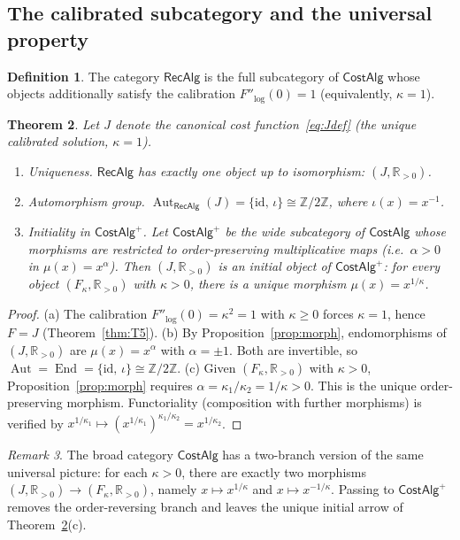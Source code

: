 \documentclass[11pt,reqno]{amsart}
\theoremstyle{plain}
\newtheorem{theorem}{Theorem}[section]
\theoremstyle{definition}
\newtheorem{definition}[theorem]{Definition}
\theoremstyle{remark}
\newtheorem{remark}[theorem]{Remark} %
\newcommand{\Jcost}{J}
\newcommand{\RR}{\mathbb{R}}
\newcommand{\ZZ}{\mathbb{Z}}
\newcommand{\1}{\mathbf{1}}
\newcommand{\paperadd}[1]{{\color{paperblue}#1}}
\begin{document}
\subsection{The calibrated subcategory and the universal property}
\begin{definition}\label{def:cat}
The category $\mathsf{RecAlg}$ is the full subcategory of
$\mathsf{CostAlg}$ whose objects additionally satisfy the
calibration $F''_{\!\log}(0)=1$ (equivalently, $\kappa=1$).
\end{definition} 

\begin{theorem}\label{thm:initial}
Let $\Jcost$ denote the canonical cost function~\eqref{eq:Jdef}
(the unique calibrated solution, $\kappa=1$).
\begin{enumerate}[nosep,label=\textup{(\alph*)}]
\item Uniqueness. $\mathsf{RecAlg}$ has exactly one object up to isomorphism: $(\Jcost,\RR_{>0})$.
\item Automorphism group. $\operatorname{Aut}_{\mathsf{RecAlg}}(\Jcost) =\{\mathrm{id},\,\iota\}\cong\ZZ/2\ZZ$, where $\iota(x)=x^{-1}$.
\item Initiality in $\mathsf{CostAlg}^{+}$. Let $\mathsf{CostAlg}^{+}$ be the wide subcategory of $\mathsf{CostAlg}$ whose morphisms are restricted to \emph{order-preserving} multiplicative maps (i.e.\ $\alpha>0$ in $\mu(x)=x^\alpha$). Then $(\Jcost,\RR_{>0})$ is an \emph{initial object} of $\mathsf{CostAlg}^{+}$: for every object $(F_\kappa,\RR_{>0})$ with $\kappa>0$, there is a unique morphism $\mu(x)=x^{1/\kappa}$.
\end{enumerate}
\end{theorem}

\begin{proof}
(a) The calibration $F''_{\!\log}(0)=\kappa^2=1$ with $\kappa\ge0$
forces $\kappa=1$, hence $F=\Jcost$ (Theorem~\ref{thm:T5}). (b) By Proposition~\ref{prop:morph}, endomorphisms of
$(\Jcost,\RR_{>0})$ are $\mu(x)=x^\alpha$ with
$\alpha=\pm1$. Both are invertible, so
$\operatorname{Aut}=\operatorname{End}
=\{\mathrm{id},\,\iota\}\cong\ZZ/2\ZZ$. (c) Given $(F_\kappa,\RR_{>0})$ with $\kappa>0$,
Proposition~\ref{prop:morph} requires $\alpha=\kappa_1/\kappa_2
=1/\kappa>0$. This is the unique order-preserving morphism.
Functoriality (composition with further morphisms) is verified by
$x^{1/\kappa_1}\mapsto (x^{1/\kappa_1})^{\kappa_1/\kappa_2}
=x^{1/\kappa_2}$.
\end{proof} 

\begin{remark}\label{rem:signed-cost-morphisms}
\paperadd{The broad category $\mathsf{CostAlg}$ has a two-branch version of the same universal picture: for each \(\kappa>0\), there are exactly two morphisms \((\Jcost,\RR_{>0})\to(F_\kappa,\RR_{>0})\), namely \(x\mapsto x^{1/\kappa}\) and \(x\mapsto x^{-1/\kappa}\). Passing to \(\mathsf{CostAlg}^{+}\) removes the order-reversing branch and leaves the unique initial arrow of Theorem~\ref{thm:initial}(c).}
\end{remark}
\end{document}
